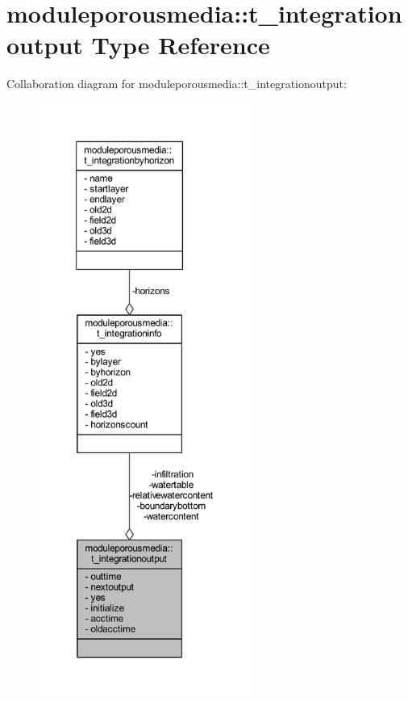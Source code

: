 \hypertarget{structmoduleporousmedia_1_1t__integrationoutput}{}\section{moduleporousmedia\+:\+:t\+\_\+integrationoutput Type Reference}
\label{structmoduleporousmedia_1_1t__integrationoutput}


Collaboration diagram for moduleporousmedia\+:\+:t\+\_\+integrationoutput\+:\nopagebreak
\begin{figure}[H]
\begin{center}
\leavevmode
\includegraphics[height=550pt]{structmoduleporousmedia_1_1t__integrationoutput__coll__graph}
\end{center}
\end{figure}
